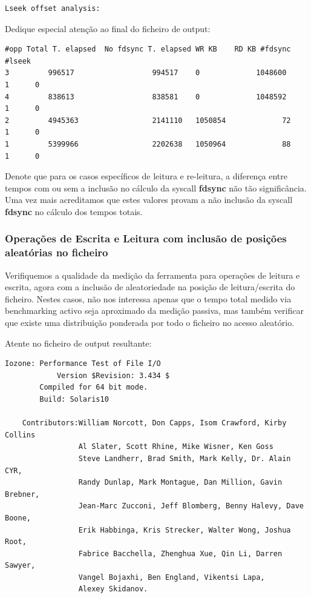\documentclass[a4paper]{article}
\begin{document}
{\begin{lstlisting}[style=output]
 Lseek offset analysis:
\end{lstlisting}

Dedique especial atenção ao final do ficheiro de output:


\begin{lstlisting}[style=command]
#opp Total T. elapsed  No fdsync T. elapsed WR KB    RD KB #fdsync  #lseek
3    	  996517	              994517	0  	          1048600          1      0
4    	  838613	              838581	0  	          1048592          1      0
2    	  4945363	              2141110	1050854  	        72         1      0
1    	  5399966	              2202638	1050964  	        88         1      0
\end{lstlisting}

Denote que para os casos específicos de leitura e re-leitura, a diferença entre tempos com ou sem a inclusão no cálculo da syscall \textbf{fdsync} não tão significância. Uma vez mais acreditamos que estes valores provam a não inclusão da syscall   \textbf{fdsync} no cálculo dos tempos totais.\par


\subsubsection{Operações de Escrita e Leitura com  inclusão de posições aleatórias no ficheiro  }


Verifiquemos a qualidade da medição da ferramenta para operações de leitura e escrita, agora com a inclusão de aleatoriedade na posição de leitura/escrita do ficheiro. Nestes casos, não nos interessa apenas que o tempo total medido via benchmarking activo seja aproximado da medição passiva, mas também verificar que existe uma distribuição ponderada por todo o ficheiro no acesso aleatório.\par 
Atente no ficheiro de output resultante:

\begin{lstlisting}[style=output]
	Iozone: Performance Test of File I/O
	        Version $Revision: 3.434 $
		Compiled for 64 bit mode.
		Build: Solaris10 

	Contributors:William Norcott, Don Capps, Isom Crawford, Kirby Collins
	             Al Slater, Scott Rhine, Mike Wisner, Ken Goss
	             Steve Landherr, Brad Smith, Mark Kelly, Dr. Alain CYR,
	             Randy Dunlap, Mark Montague, Dan Million, Gavin Brebner,
	             Jean-Marc Zucconi, Jeff Blomberg, Benny Halevy, Dave Boone,
	             Erik Habbinga, Kris Strecker, Walter Wong, Joshua Root,
	             Fabrice Bacchella, Zhenghua Xue, Qin Li, Darren Sawyer,
	             Vangel Bojaxhi, Ben England, Vikentsi Lapa,
	             Alexey Skidanov.


\end{lstlisting}}
\end{document}
